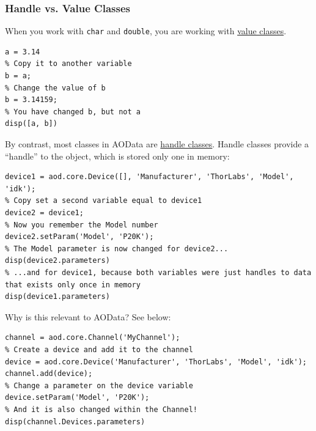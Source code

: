 \documentclass[10pt]{exam}
\newcommand\myurl[1]{\textcolor{blue}{\underline{#1}}}
\newcommand\matclass[1]{\textcolor{codeblue}{\texttt{#1}}}
\begin{document}
	\subsubsection{Handle vs. Value Classes}\label{subsubsection:HandleValue}
		\noindent When you work with \matclass{char} and \matclass{double}, you are working with \underline{value classes}. 
		\begin{lstlisting}[style=matlab-editor, basicstyle=\mlttfamily\footnotesize]
% Create a double variable
a = 3.14
% Copy it to another variable
b = a;
% Change the value of b
b = 3.14159;
% You have changed b, but not a
disp([a, b])
	\end{lstlisting}
	\noindent By contrast, most classes in AOData are \underline{handle classes}. Handle classes provide a ``handle'' to the object, which is stored only one in memory:
	\begin{lstlisting}[style=matlab-editor, basicstyle=\mlttfamily\footnotesize]
% Create a standalone Device class. It's from ThorLabs but you don't remember the Model
device1 = aod.core.Device([], 'Manufacturer', 'ThorLabs', 'Model', 'idk');
% Copy set a second variable equal to device1
device2 = device1;
% Now you remember the Model number
device2.setParam('Model', 'P20K');
% The Model parameter is now changed for device2...
disp(device2.parameters)
% ...and for device1, because both variables were just handles to data that exists only once in memory
disp(device1.parameters)
		\end{lstlisting}
		\noindent Why is this relevant to AOData? See below:
		\begin{lstlisting}[style=matlab-editor, basicstyle=\mlttfamily\footnotesize]
% Create a channel
channel = aod.core.Channel('MyChannel');
% Create a device and add it to the channel
device = aod.core.Device('Manufacturer', 'ThorLabs', 'Model', 'idk');
channel.add(device);
% Change a parameter on the device variable
device.setParam('Model', 'P20K');
% And it is also changed within the Channel!
disp(channel.Devices.parameters)
		\end{lstlisting}
	
\end{document}
